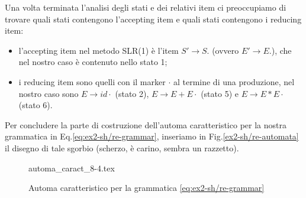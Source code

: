 \documentclass[class=book, crop=false, oneside, 12pt]{standalone}
\begin{document}
Una volta terminata l'analisi degli stati e dei relativi item ci preoccupiamo di trovare quali stati contengono l'accepting item e quali stati contengono i reducing item:
\begin{itemize}
    \item l'accepting item nel metodo SLR(1) è l'item \(S' \to S.\) (ovvero \(E' \to E.\)), che nel nostro caso è contenuto nello stato 1;
    \item i reducing item sono quelli con il marker \(\cdot\) al termine di una produzione, nel nostro caso sono \(E \to id \cdot\) (stato 2), \(E \to E+E \cdot\) (stato 5) e \(E \to E*E \cdot\) (stato 6).
\end{itemize}

Per concludere la parte di costruzione dell'automa caratteristico per la nostra grammatica in Eq.\ref{eq:ex2-sh/re-grammar}, inseriamo in Fig.\ref{ex2-sh/re-automata} il disegno di tale sgorbio (scherzo, è carino, sembra un razzetto).
\begin{figure}[H]
    \center
	{automa_caract_8-4.tex}
    \caption{Automa caratteristico per la grammatica \ref{eq:ex2-sh/re-grammar}}
    \label{fig:ex2-sh/re-automata}
\end{figure}
\end{document}
